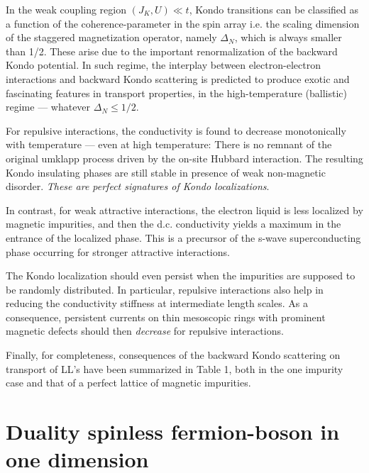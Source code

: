 In the weak coupling region $(J_K,U)\ll t$, Kondo transitions can be
classified as a function of the coherence-parameter in the spin array i.e.
the scaling dimension of the staggered magnetization operator,
namely $\Delta_N$, which is always smaller than 1/2. These
arise due to the important renormalization
of the backward Kondo 
potential. In such regime, the interplay between electron-electron 
interactions and backward Kondo scattering is
predicted to produce exotic and fascinating features in transport properties,
in the high-temperature (ballistic) regime --- whatever $\Delta_N\leq 1/2$.

For repulsive interactions, the conductivity is found to decrease 
monotonically with temperature --- even
at high temperature: There is no remnant of the original umklapp process
driven by the on-site Hubbard interaction.
The resulting Kondo insulating phases are still stable in presence of weak
non-magnetic disorder. {\it These are 
perfect signatures of Kondo localizations}. 

In contrast, for weak 
attractive interactions, the electron liquid is less
localized by magnetic impurities, and then the d.c. conductivity yields a 
maximum in the entrance of the
localized phase. This is a precursor of the s-wave superconducting phase 
occurring for stronger attractive interactions. 

The Kondo localization should even persist when the impurities are supposed
to be randomly distributed. In particular, repulsive interactions
also help in reducing the conductivity stiffness at
intermediate length scales. As a consequence, persistent
currents on thin mesoscopic rings with prominent magnetic defects should
then \emph{decrease} for repulsive interactions.

Finally, for completeness, consequences of the
backward Kondo scattering on transport of LL's have been summarized
in Table 1, both in the one impurity case and that of a perfect lattice of
magnetic impurities. 


\appendix
\section{Duality spinless fermion-boson in one dimension}

